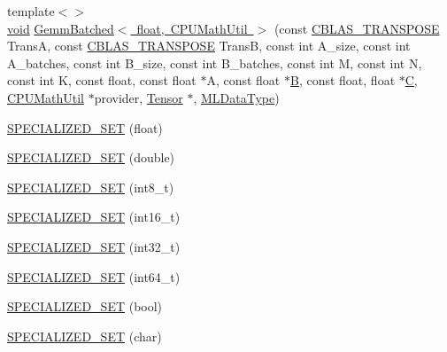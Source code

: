 \begin{DoxyCompactItemize}
\item 
{\footnotesize template$<$$>$ }\\\mbox{\hyperlink{mlasi_8h_a88f941d423cb2a819b70a1358982b1a6}{void}} \mbox{\hyperlink{namespaceonnxruntime_1_1math_a539b25bb6fa905d986a740ed0ff61f0e}{Gemm\+Batched$<$ float, C\+P\+U\+Math\+Util $>$}} (const \mbox{\hyperlink{cblas_8h_a44dfaddb823648755b110dbad849c5a9}{C\+B\+L\+A\+S\+\_\+\+T\+R\+A\+N\+S\+P\+O\+SE}} TransA, const \mbox{\hyperlink{cblas_8h_a44dfaddb823648755b110dbad849c5a9}{C\+B\+L\+A\+S\+\_\+\+T\+R\+A\+N\+S\+P\+O\+SE}} TransB, const int A\+\_\+size, const int A\+\_\+batches, const int B\+\_\+size, const int B\+\_\+batches, const int M, const int N, const int K, const float, const float $\ast$A, const float $\ast$\mbox{\hyperlink{mlasi_8h_a472f4360dfbf830e5135980ff43484b9}{B}}, const float, float $\ast$\mbox{\hyperlink{mlasi_8h_a5693f8b3559ce97985de5239fdcf6006}{C}}, \mbox{\hyperlink{classonnxruntime_1_1CPUMathUtil}{C\+P\+U\+Math\+Util}} $\ast$provider, \mbox{\hyperlink{classonnxruntime_1_1Tensor}{Tensor}} $\ast$, \mbox{\hyperlink{namespaceonnxruntime_ad77d0a6e838ec7da5dc35fed5ee66b49}{M\+L\+Data\+Type}})
\item 
\mbox{\hyperlink{namespaceonnxruntime_1_1math_adab07301d9e5c71a0bb01f01814fb215}{S\+P\+E\+C\+I\+A\+L\+I\+Z\+E\+D\+\_\+\+S\+ET}} (float)
\item 
\mbox{\hyperlink{namespaceonnxruntime_1_1math_a1753d26885bde93c37ba49fe0f6b3940}{S\+P\+E\+C\+I\+A\+L\+I\+Z\+E\+D\+\_\+\+S\+ET}} (double)
\item 
\mbox{\hyperlink{namespaceonnxruntime_1_1math_affe96f99d52b21d26395b273d58a7784}{S\+P\+E\+C\+I\+A\+L\+I\+Z\+E\+D\+\_\+\+S\+ET}} (int8\+\_\+t)
\item 
\mbox{\hyperlink{namespaceonnxruntime_1_1math_ac248e86639fe34d1a30ae764ad4a05d2}{S\+P\+E\+C\+I\+A\+L\+I\+Z\+E\+D\+\_\+\+S\+ET}} (int16\+\_\+t)
\item 
\mbox{\hyperlink{namespaceonnxruntime_1_1math_a181d9964415a98de9080e8838641d9b2}{S\+P\+E\+C\+I\+A\+L\+I\+Z\+E\+D\+\_\+\+S\+ET}} (int32\+\_\+t)
\item 
\mbox{\hyperlink{namespaceonnxruntime_1_1math_ac8502f2d2002aab86e04f41351a31439}{S\+P\+E\+C\+I\+A\+L\+I\+Z\+E\+D\+\_\+\+S\+ET}} (int64\+\_\+t)
\item 
\mbox{\hyperlink{namespaceonnxruntime_1_1math_a592615674e0b60427db47c6e5651269e}{S\+P\+E\+C\+I\+A\+L\+I\+Z\+E\+D\+\_\+\+S\+ET}} (bool)
\item 
\mbox{\hyperlink{namespaceonnxruntime_1_1math_abefec0dc5bedd5c2ac09d7799f2612d2}{S\+P\+E\+C\+I\+A\+L\+I\+Z\+E\+D\+\_\+\+S\+ET}} (char)

\end{DoxyCompactItemize}
